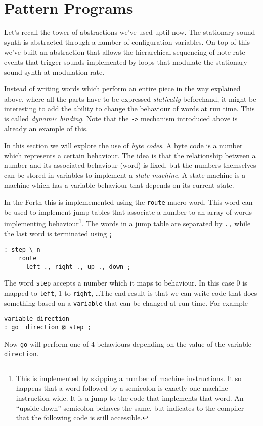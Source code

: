 \documentclass[12pt]{article}
\begin{document}

\section{Pattern Programs}

Let's recall the tower of abstractions we've used uptil now. The
stationary sound synth is abstracted through a number of configuration
variables. On top of this we've built an abstraction that allows the
hierarchical sequencing of note rate events that trigger sounds
implemented by loops that modulate the stationary sound synth at
modulation rate.

Instead of writing words which perform an entire piece in the way
explained above, where all the parts have to be expressed
\emph{statically} beforehand, it might be interesting to add the
ability to change the behaviour of words at run time. This is called
\emph{dynamic binding}. Note that the \verb|->| mechanism introduced
above is already an example of this.

In this section we will explore the use of \emph{byte codes}. A byte
code is a number which represents a certain behaviour. The idea is
that the relationship between a number and its associated behaviour
(word) is fixed, but the numbers themselves can be stored in variables
to implement a \emph{state machine}. A state machine is a machine
which has a variable behaviour that depends on its current state.

In the Forth this is implememented using the \verb|route| macro word.
This word can be used to implement jump tables that associate a number
to an array of words implementing behaviour\footnote{This is
  implemented by skipping a number of machine instructions. It so
  happens that a word followed by a semicolon is exactly one machine
  instruction wide. It is a jump to the code that implements that
  word.  An ``upside down'' semicolon behaves the same, but indicates
  to the compiler that the following code is still accessible.}. The
words in a jump table are separated by \verb|.,| while the last word
is terminated using \verb|;|
\begin{verbatim}
: step \ n -- 
    route
      left ., right ., up ., down ;
\end{verbatim}
The word \verb|step| accepts a number which it maps to behaviour. In
this case 0 is mapped to \verb|left|, 1 to \verb|right|, \ldots The
end result is that we can write code that does something based on a
\verb|variable| that can be changed at run time. For example
\begin{verbatim}
variable direction
: go  direction @ step ;
\end{verbatim}
Now \verb|go| will perform one of 4 behaviours depending on the value
of the variable \verb|direction|.
\end{document}

